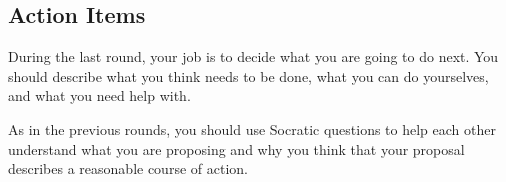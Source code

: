 \documentclass[a6paper, 11pt, parskip=half, DIV=15]{scrartcl}
\begin{document}
\newpage
\enlargethispage{1.75\baselineskip}

\subsection*{Action Items}
During the last round, your job is to decide what you are going to do next.
You should describe what you think needs to be done, what you can do yourselves, and what you need help with.

\vfill

\begin{center}
\end{center}

\vfill

As in the previous rounds, you should use Socratic questions to help each other understand what you are proposing and why you think that your proposal describes a reasonable course of action.

\end{document}
